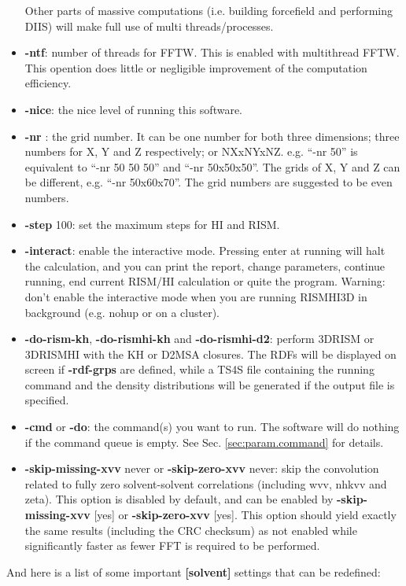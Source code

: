 \documentclass[aip,amsmath,amssymb,reprint,onecolumn]{revtex4-1}
\begin{document}
\begin{itemize}
        Other parts of massive computations (i.e. building forcefield and performing DIIS) will make full use of multi threads/processes.
    \item {\bf -ntf}: number of threads for FFTW. This is enabled with multithread FFTW. This opention does little or negligible improvement of the computation efficiency.
    \item {\bf -nice}: the nice level of running this software.
    \item {\bf -nr }: the grid number. It can be one number for both three dimensions; three numbers for X, Y and Z respectively; or NXxNYxNZ. e.g. ``-nr 50'' is equivalent to ``-nr 50 50 50'' and ``-nr 50x50x50''. The grids of X, Y and Z can be different, e.g. ``-nr 50x60x70''. The grid numbers are suggested to be even numbers.
    \item {\bf -step} 100: set the maximum steps for HI and RISM.
    \item {\bf -interact}: enable the interactive mode. Pressing enter at running will halt the calculation, and you can print the report, change parameters, continue running, end current RISM/HI calculation or quite the program. Warning: don't enable the interactive mode when you are running RISMHI3D in background (e.g. nohup or on a cluster).
    \item {\bf -do-rism-kh}, {\bf -do-rismhi-kh} and {\bf -do-rismhi-d2}: perform 3DRISM or 3DRISMHI with the KH or D2MSA closures. The RDFs will be displayed on screen if {\bf -rdf-grps} are defined, while a TS4S file containing the running command and the density distributions will be generated if the output file is specified.
    \item {\bf -cmd} or {\bf -do}: the command(s) you want to run. The software will do nothing if the command queue is empty. See Sec. \ref{sec:param.command} for details.
    \item {\bf -skip-missing-xvv} never or {\bf -skip-zero-xvv} never: skip the convolution related to fully zero solvent-solvent correlations (including wvv, nhkvv and zeta). This option is disabled by default, and can be enabled by {\bf -skip-missing-xvv} [yes] or {\bf -skip-zero-xvv} [yes]. This option should yield exactly the same results (including the CRC checksum) as not enabled while significantly faster as fewer FFT is required to be performed.
\end{itemize}

And here is a list of some important {\bf [solvent]} settings that can be redefined:
\end{document}
